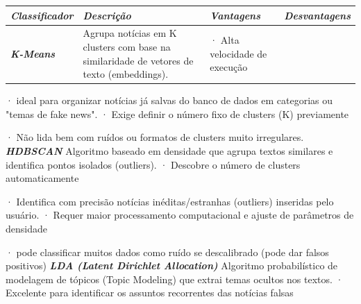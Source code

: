 \documentclass[
  brazilian,
  11pt,
]{article}
\newcounter{none} %
\begin{document}
{\def\LTcaptype{none} %
\begin{longtable}[]{@{}
  >{\raggedright\arraybackslash}p{}
  >{\raggedright\arraybackslash}p{}
  >{\raggedright\arraybackslash}p{}
  >{\raggedright\arraybackslash}p{}@{}}
\toprule\noalign{}
\begin{minipage}[b]{\linewidth}\raggedright
\textbf{\emph{Classificador}}
\end{minipage} & \begin{minipage}[b]{\linewidth}\raggedright
\textbf{\emph{Descrição}}
\end{minipage} & \begin{minipage}[b]{\linewidth}\raggedright
\textbf{\emph{Vantagens}}
\end{minipage} & \begin{minipage}[b]{\linewidth}\raggedright
\textbf{\emph{Desvantagens}}
\end{minipage} \\
\midrule\noalign{}
\endhead
\bottomrule\noalign{}
\endlastfoot
\textbf{\emph{K-Means}} & Agrupa notícias em K clusters com base na similaridade de vetores de texto (embeddings). & · Alta velocidade de execução & \\
\end{longtable}
}

· ideal para organizar notícias já salvas do banco de dados em categorias ou "temas de fake news". \textbar{} · Exige definir o número fixo de clusters (K) previamente

· Não lida bem com ruídos ou formatos de clusters muito irregulares. \textbar{}
\textbar{} \textbf{\emph{HDBSCAN}} \textbar{} Algoritmo baseado em densidade que agrupa textos similares e identifica pontos isolados (outliers). \textbar{} · Descobre o número de clusters automaticamente

· Identifica com precisão notícias inéditas/estranhas (outliers) inseridas pelo usuário. \textbar{} · Requer maior processamento computacional e ajuste de parâmetros de densidade

· pode classificar muitos dados como ruído se descalibrado (pode dar falsos positivos) \textbar{}
\textbar{} \textbf{\emph{LDA (Latent Dirichlet Allocation)}} \textbar{} Algoritmo probabilístico de modelagem de tópicos (Topic Modeling) que extrai temas ocultos nos textos. \textbar{} · Excelente para identificar os assuntos recorrentes das notícias falsas
\end{document}
